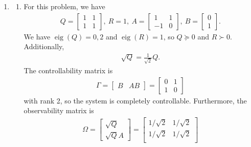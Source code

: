 \documentclass[letterpaper,11pt,titlepage]{article}
\DeclareMathOperator{\eig}{eig}
\begin{document}
\begin{enumerate}[leftmargin=0pt]
    \item 
        \begin{enumerate}
            \item For this problem, we have
                \begin{gather}
                    Q = \begin{bmatrix}
                        1 & 1 \\ 1 & 1
                    \end{bmatrix},\
                    R = 1,\
                    A = \begin{bmatrix}
                        1 & 1 \\ -1 & 0
                    \end{bmatrix},\
                    B = \begin{bmatrix}
                        0 \\ 1
                    \end{bmatrix}.
                \end{gather}
                We have $\eig(Q)=0,2$ and $\eig(R)=1$, so $Q\succcurlyeq 0$ and $R\succ 0$. Additionally,
                \begin{gather}
                    \sqrt{Q} = \frac{1}{\sqrt{2}} Q.
                \end{gather}
                The controllability matrix is
                \begin{gather}
                    \Gamma = \begin{bmatrix}
                        B & AB
                    \end{bmatrix}
                    = \begin{bmatrix}
                        0 & 1 \\ 1 & 0
                    \end{bmatrix}
                \end{gather}
                with rank 2, so the system is completely controllable. Furthermore, the observability matrix is
                \begin{gather}
                    \Omega = \begin{bmatrix}
                        \sqrt{Q} \\ \sqrt{Q} A
                    \end{bmatrix}
                    = \begin{bmatrix}
                        1/\sqrt{2} & 1/\sqrt{2} \\
                        1/\sqrt{2} & 1/\sqrt{2} \\

\end{bmatrix}
\end{gather}
\end{enumerate}
\end{enumerate}
\end{document}
